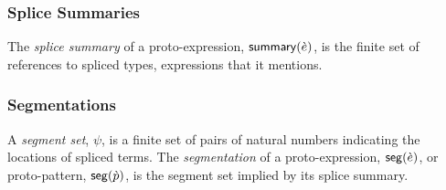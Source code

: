 \subsubsection{Splice Summaries}
The \emph{splice summary} of a proto-expression, $\mathsf{summary}(\grave{e})$,  is the finite set of references to spliced types, expressions  that it mentions.

\subsubsection{Segmentations}
A \emph{segment set}, $\psi$, is a finite set of pairs of natural numbers indicating the locations of spliced terms. The \emph{segmentation} of a proto-expression, $\mathsf{seg}(\grave{e})$, or proto-pattern, $\mathsf{seg}(\grave{p})$, is the segment set implied by its splice summary.




